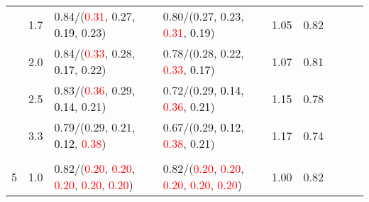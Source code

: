 \documentclass[10pt,a4paper]{report}
\begin{document}
\begin{table}[!htbp]
\begin{center}
{\begin{tabular}{ccllccccc}
				  & 1.7                               & 0.84/(\textcolor{red}{0.31}, 0.27, \textcolor{black}{0.19}, 0.23)                                                                                                                             & 0.80/(0.27, 0.23, \textcolor{red}{0.31}, \textcolor{black}{0.19})                                                                                                                             & 1.05             & 0.82                     \\
				  & 2.0                               & 0.84/(\textcolor{red}{0.33}, 0.28, \textcolor{black}{0.17}, 0.22)                                                                                                                             & 0.78/(0.28, 0.22, \textcolor{red}{0.33}, \textcolor{black}{0.17})                                                                                                                             & 1.07             & 0.81                     \\
				  & 2.5                               & 0.83/(\textcolor{red}{0.36}, 0.29, \textcolor{black}{0.14}, 0.21)                                                                                                                             & 0.72/(0.29, \textcolor{black}{0.14}, \textcolor{red}{0.36}, 0.21)                                                                                                                             & 1.15             & 0.78                     \\
				  & 3.3                               & 0.79/(0.29, 0.21, \textcolor{black}{0.12}, \textcolor{red}{0.38})                                                                                                                             & 0.67/(0.29, \textcolor{black}{0.12}, \textcolor{red}{0.38}, 0.21)                                                                                                                             & 1.17             & 0.74                     \\
				  &                                   &                                                                                                                                                                                               &                                                                                                                                                                                               &                                             \\
				5 & 1.0                               & 0.82/(\textcolor{red}{0.20}, \textcolor{red}{0.20}, \textcolor{red}{0.20}, \textcolor{red}{0.20}, \textcolor{red}{0.20})                                                                      & 0.82/(\textcolor{red}{0.20}, \textcolor{red}{0.20}, \textcolor{red}{0.20}, \textcolor{red}{0.20}, \textcolor{red}{0.20})                                                                      & 1.00             & 0.82                     \\

\end{tabular}}
\end{center}
\end{table}
\end{document}
